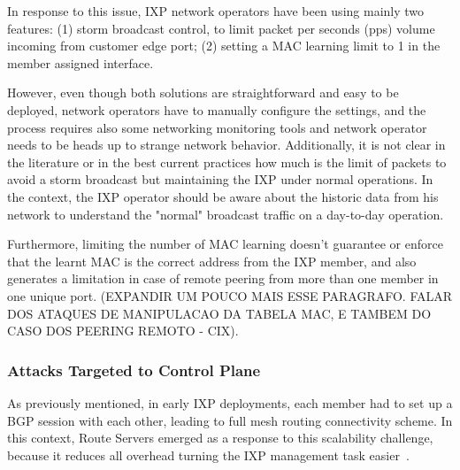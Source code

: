 \documentclass[12pt]{article}
\begin{document}

In response to this issue, IXP network operators have been using mainly two features: (1) storm broadcast control, to limit packet per seconds (pps) volume incoming from customer edge port; (2) setting a MAC learning limit to 1 in the member assigned interface. 

However, even though both solutions are straightforward and easy to be deployed, network operators have to manually configure the settings, and the process requires also some networking monitoring tools and network operator needs to be heads up to strange network behavior. Additionally, it is not clear in the literature or in the best current practices how much is the limit of packets to avoid a storm broadcast but maintaining the IXP under normal operations. In the context, the IXP operator should be aware about the historic data from his network to understand the "normal" broadcast traffic on a day-to-day operation.

Furthermore, limiting the number of MAC learning doesn't guarantee or enforce that the learnt MAC is the correct address from the IXP member, and also generates a limitation in case of remote peering from more than one member in one unique port. (EXPANDIR UM POUCO MAIS ESSE PARAGRAFO. FALAR DOS ATAQUES DE MANIPULACAO DA TABELA MAC, E TAMBEM DO CASO DOS PEERING REMOTO - CIX).

\subsubsection{Attacks Targeted to Control Plane}
As previously mentioned, in early IXP deployments, each member had to set up a BGP session with each other, leading to full mesh routing connectivity scheme. In this context, Route Servers emerged as a response to this scalability challenge, because it reduces all overhead turning the IXP management task easier~\cite{lu2005networking}.
\end{document}

